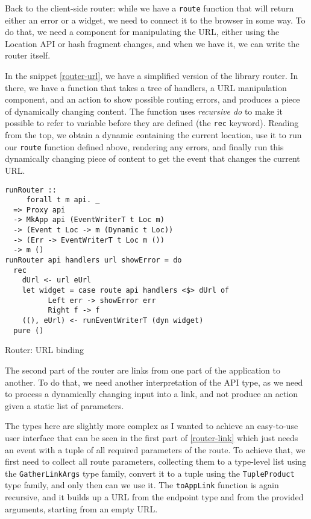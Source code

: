 \documentclass[english,odsaz]{fitthesis}
\begin{document}
Back to the client-side router: while we have a \texttt{route} function that will return
either an error or a widget, we need to connect it to the browser in some way.
To do that, we need a component for manipulating the URL, either using the
Location API or hash fragment changes, and when we have it, we can write the
router itself.

In the snippet \ref{router-url}, we have a simplified version of the library
router. In there, we have a function that takes a tree of handlers, a URL
manipulation component, and an action to show possible routing errors, and
produces a piece of dynamically changing content. The function uses \emph{recursive do}
to make it possible to refer to variable before they are defined (the \texttt{rec}
keyword). Reading from the top, we obtain a dynamic containing the current
location, use it to run our \texttt{route} function defined above, rendering any errors,
and finally run this dynamically changing piece of content to get the event that
changes the current URL.

\begin{listing}[htbp]
\begin{verbatim}
runRouter ::
     forall t m api. _
  => Proxy api
  -> MkApp api (EventWriterT t Loc m)
  -> (Event t Loc -> m (Dynamic t Loc))
  -> (Err -> EventWriterT t Loc m ())
  -> m ()
runRouter api handlers url showError = do
  rec
    dUrl <- url eUrl
    let widget = case route api handlers <$> dUrl of
          Left err -> showError err
          Right f -> f
    ((), eUrl) <- runEventWriterT (dyn widget)
  pure ()

\end{verbatim}
\caption{Router: URL binding \label{router-url}}
\end{listing}

The second part of the router are links from one part of the application to
another. To do that, we need another interpretation of the API type, as we need
to process a dynamically changing input into a link, and not produce an action
given a static list of parameters.

The types here are slightly more complex as I wanted to achieve an easy-to-use
user interface that can be seen in the first part of \ref{router-link} which just
needs an event with a tuple of all required parameters of the route. To achieve
that, we first need to collect all route parameters, collecting them to a
type-level list using the \texttt{GatherLinkArgs} type family, convert it to a tuple
using the \texttt{TupleProduct} type family, and only then can we use it. The
\texttt{toAppLink} function is again recursive, and it builds up a URL from the endpoint
type and from the provided arguments, starting from an empty URL.
\end{document}
